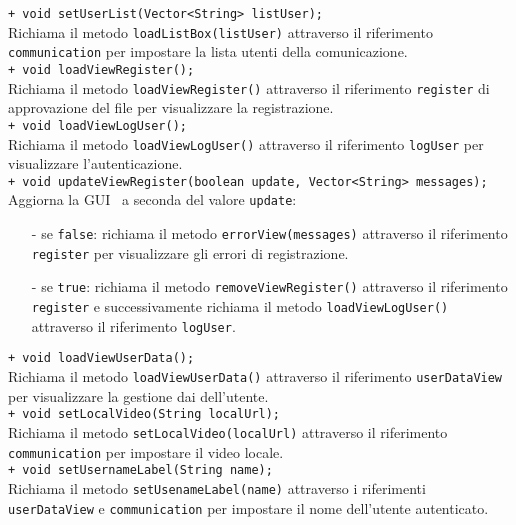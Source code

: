 {\begin{sloppypar}
{{\begin{itemize}
				\texttt{+ void setUserList(Vector<String> listUser);}\\
				Richiama il metodo \texttt{loadListBox(listUser)} attraverso il riferimento \texttt{communication} per impostare la lista utenti della comunicazione.\\

				\texttt{+ void loadViewRegister();}\\
				Richiama il metodo \texttt{loadViewRegister()} attraverso il riferimento \texttt{register} di approvazione del file  per visualizzare la registrazione.\\

				\texttt{+ void loadViewLogUser();}\\
				Richiama il metodo \texttt{loadViewLogUser()} attraverso il riferimento \texttt{logUser} per visualizzare l'autenticazione.\\

				\texttt{+ void updateViewRegister(boolean update, Vector<String> messages);}\\
				Aggiorna la GUI\g~ a seconda del valore \texttt{update}:
				\begin{itemize}
					\item[-] se \texttt{false}: richiama il metodo \texttt{errorView(messages)} attraverso il riferimento \texttt{register} per visualizzare gli errori di registrazione.
					\item[-] se \texttt{true}: richiama il metodo \texttt{removeViewRegister()} attraverso il riferimento \texttt{register} e successivamente richiama il metodo \texttt{loadViewLogUser()} attraverso il riferimento \texttt{logUser}.\\
				\end{itemize}

				\texttt{+ void loadViewUserData();}\\
				Richiama il metodo \texttt{loadViewUserData()} attraverso il riferimento \texttt{userDataView} per visualizzare la gestione dai dell'utente.\\

				\texttt{+ void setLocalVideo(String localUrl);}\\
				Richiama il metodo \texttt{setLocalVideo(localUrl)} attraverso il riferimento \texttt{communication} per impostare il video locale.\\

				\texttt{+ void setUsernameLabel(String name);}\\
				Richiama il metodo \texttt{setUsenameLabel(name)} attraverso i riferimenti \texttt{userDataView} e \texttt{communication} per impostare il nome dell'utente autenticato.\\


\end{itemize}}}
\end{sloppypar}}

